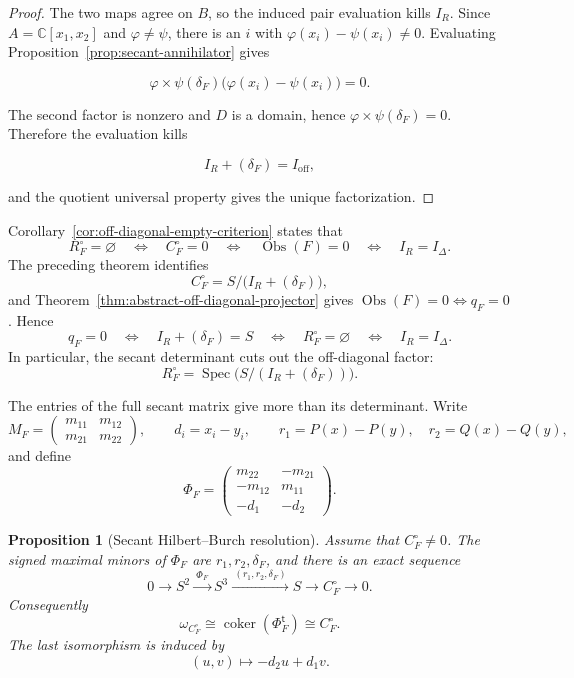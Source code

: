 \documentclass[11pt]{article}
\newtheorem{proposition}[theorem]{Proposition}
\theoremstyle{remark}
\theoremstyle{definition}
\DeclareMathOperator{\Spec}{Spec}
\newcommand{\C}{\mathbb C}
\newcommand{\Obs}{\operatorname{Obs}}
\begin{document}
\begin{proof}
The two maps agree on \(B\), so the induced pair evaluation kills \(I_R\).
Since \(A=\C[x_1,x_2]\) and \(\varphi\ne\psi\), there is an \(i\) with
\(\varphi(x_i)-\psi(x_i)\ne0\).  Evaluating
Proposition~\ref{prop:secant-annihilator} gives

\[
  \varphi\!\times\!\psi(\delta_F)
  \bigl(\varphi(x_i)-\psi(x_i)\bigr)=0.
\]

The second factor is nonzero and \(D\) is a domain, hence
\(\varphi\!\times\!\psi(\delta_F)=0\).  Therefore the evaluation kills

\[
  I_R+(\delta_F)=I_{\mathrm{off}},
\]

and the quotient universal property gives the unique factorization.
\end{proof}

Corollary~\ref{cor:off-diagonal-empty-criterion} states that
\[
  R_F^\circ=\varnothing
  \quad\Longleftrightarrow\quad
  C_F^\circ=0
  \quad\Longleftrightarrow\quad
  \Obs(F)=0
  \quad\Longleftrightarrow\quad
  I_R=I_\Delta.
\]
The preceding theorem identifies
\[
  C_F^\circ
  =
  S\big/\bigl(I_R+(\delta_F)\bigr),
\]
and Theorem~\ref{thm:abstract-off-diagonal-projector} gives
\(\Obs(F)=0\Longleftrightarrow q_F=0\).  Hence
\[
  q_F=0
  \quad\Longleftrightarrow\quad
  I_R+(\delta_F)=S
  \quad\Longleftrightarrow\quad
  R_F^\circ=\varnothing
  \quad\Longleftrightarrow\quad
  I_R=I_\Delta.
\]
In particular, the secant determinant cuts out the off-diagonal factor:
\[
  R_F^\circ
  =
  \Spec\!\bigl(S/(I_R+(\delta_F))\bigr).
\]

The entries of the full secant matrix give more than its determinant.  Write
\[
  M_F=
  \begin{pmatrix}
    m_{11}&m_{12}\\
    m_{21}&m_{22}
  \end{pmatrix},
  \qquad
  d_i=x_i-y_i,
  \qquad
  r_1=P(x)-P(y),\quad r_2=Q(x)-Q(y),
\]
and define
\[
  \Phi_F=
  \begin{pmatrix}
    m_{22}&-m_{21}\\
    -m_{12}&m_{11}\\
    -d_1&-d_2
  \end{pmatrix}.
\]

\begin{proposition}[Secant Hilbert--Burch resolution]
\label{prop:secant-hilbert-burch}
Assume that \(C_F^\circ\ne0\).  The signed maximal minors of \(\Phi_F\)
are \(r_1,r_2,\delta_F\), and there is an exact sequence
\[
  0\longrightarrow S^2
  \xrightarrow{\ \Phi_F\ }S^3
  \xrightarrow{\ (r_1,r_2,\delta_F)\ }S
  \longrightarrow C_F^\circ\longrightarrow0.
\]
Consequently
\[
  \omega_{C_F^\circ}
  \cong\operatorname{coker}(\Phi_F^{\mathsf t})
  \cong C_F^\circ.
\]
The last isomorphism is induced by
\[
  (u,v)\longmapsto-d_2u+d_1v.
\]
\end{proposition}
\end{document}
